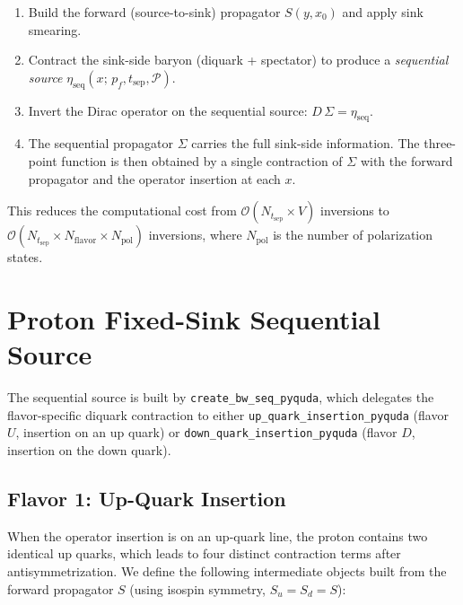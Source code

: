 \documentclass[11pt,a4paper]{article}
\newcommand{\PolProj}{\mathcal{P}}
\newcommand{\seqsrc}{\eta_{\text{seq}}}
\newcommand{\seqprop}{\Sigma}
\newcommand{\fwprop}{S}
\newcommand{\xsrc}{x_{0}}
\newcommand{\xsink}{y}
\newcommand{\pfinal}{p_{f}}
\begin{document}
\begin{enumerate}
  \item Build the forward (source-to-sink) propagator $\fwprop(\xsink,\xsrc)$
        and apply sink smearing.
  \item Contract the sink-side baryon (diquark + spectator) to produce a
        \emph{sequential source} $\seqsrc(x;\,\pfinal,t_{\text{sep}},\PolProj)$.
  \item Invert the Dirac operator on the sequential source:
        $D\,\seqprop = \seqsrc$.
  \item The sequential propagator $\seqprop$ carries the full sink-side
        information.  The three-point function is then obtained by a single
        contraction of $\seqprop$ with the forward propagator and the operator
        insertion at each $x$.
\end{enumerate}

This reduces the computational cost from $\mathcal{O}(N_{t_{\text{sep}}} \times V)$
inversions to $\mathcal{O}(N_{t_{\text{sep}}} \times N_{\text{flavor}} \times
N_{\text{pol}})$ inversions, where $N_{\text{pol}}$ is the number of polarization
states.

\section{Proton Fixed-Sink Sequential Source}

The sequential source is built by \texttt{create\_bw\_seq\_pyquda}, which
delegates the flavor-specific diquark contraction to either
\texttt{up\_quark\_insertion\_pyquda} (flavor $U$, insertion on an up quark) or
\texttt{down\_quark\_insertion\_pyquda} (flavor $D$, insertion on the down quark).

\subsection{Flavor 1: Up-Quark Insertion}

When the operator insertion is on an up-quark line, the proton contains two
identical up quarks, which leads to four distinct contraction terms after
antisymmetrization.  We define the following intermediate objects built from
the forward propagator $\fwprop$ (using isospin symmetry, $\fwprop_{u}=\fwprop_{d}=\fwprop$):
\end{document}
